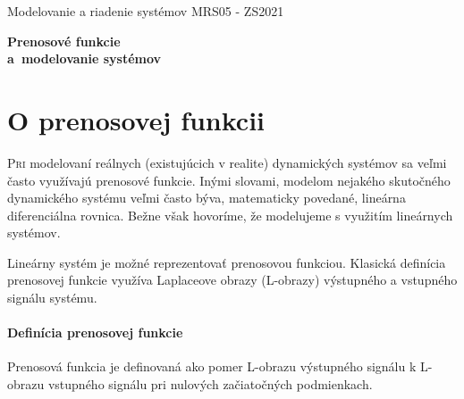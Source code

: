\documentclass[a4paper, 10pt, ]{article}
\def\oznacenieCasti{MRS05 - ZS2021}
\begin{document}
\lstset{%
style=mystyle,
rangebeginprefix=\#\#\#\ cellB\ ,%
rangebeginsuffix=\ \#\#\#,%
rangeendprefix=\#\#\#\ cellE\ ,%
rangeendsuffix=\ \#\#\#,%
includerangemarker=false,
}




\fontsize{12pt}{22pt}\selectfont

\centerline{\textsf{Modelovanie a riadenie systémov} \hfill \textsf{\oznacenieCasti}}

\fontsize{18pt}{22pt}\selectfont





\begin{flushleft}
	\textbf{\textsf{Prenosové funkcie\\a~modelovanie systémov}}
\end{flushleft}





\normalsize

\bigskip

{\hypersetup{hidelinks}

\tableofcontents

}

\bigskip

\vspace{18pt}



\section{O prenosovej funkcii}

\lettrine[lines=3, nindent=0pt]{P}{ri}
modelovaní reálnych (existujúcich v realite) dynamických systémov sa veľmi často využívajú prenosové funkcie. Inými slovami, modelom nejakého skutočného dynamického systému veľmi často býva, matematicky povedané, lineárna diferenciálna rovnica. Bežne však hovoríme, že modelujeme s využitím lineárnych systémov.

\bigskip

\noindent
Lineárny systém je možné reprezentovať prenosovou funkciou. Klasická definícia prenosovej funkcie využíva Laplaceove obrazy (L-obrazy) výstupného a vstupného signálu systému.

\paragraph{Definícia prenosovej funkcie}

Prenosová funkcia je definovaná ako pomer L-obrazu výstupného signálu k L-obrazu vstupného signálu pri nulových začiatočných podmienkach.
\end{document}
